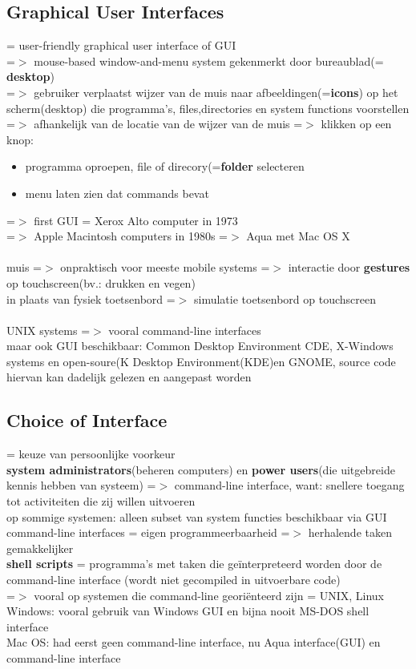 \documentclass{report}
\begin{document}
\subsection{Graphical User Interfaces}
= user-friendly graphical user interface of GUI
\\=$>$ mouse-based window-and-menu system gekenmerkt door bureaublad(= \textbf{desktop})
\\=$>$ gebruiker verplaatst wijzer van de muis naar afbeeldingen(=\textbf{icons}) op het scherm(desktop) die programma's, files,directories en system functions voorstellen
\\=$>$ afhankelijk van de locatie van de wijzer van de muis =$>$ klikken op een knop:
\begin{itemize}
\item programma oproepen, file of direcory(=\textbf{folder} selecteren
\item menu laten zien dat commands bevat
\end{itemize}
=$>$ first GUI = Xerox Alto computer in 1973
\\=$>$ Apple Macintosh computers in 1980s =$>$ Aqua met Mac OS X
\\
\\ muis =$>$ onpraktisch voor meeste mobile systems =$>$ interactie door \textbf{gestures} op touchscreen(bv.: drukken en vegen)
\\ in plaats van fysiek toetsenbord =$>$ simulatie toetsenbord op touchscreen
\\
\\UNIX systems =$>$ vooral command-line interfaces
\\maar ook GUI beschikbaar: Common Desktop Environment CDE, X-Windows systems en open-soure(K Desktop Environment(KDE)en GNOME, source code hiervan kan dadelijk gelezen en aangepast worden 

\subsection{Choice of Interface}
= keuze van persoonlijke voorkeur 
\\ \textbf{system administrators}(beheren computers) en \textbf{power users}(die uitgebreide kennis hebben van systeem) =$>$ command-line interface, want: snellere toegang tot activiteiten die zij willen uitvoeren
\\op sommige systemen: alleen subset van system functies beschikbaar via GUI
\\command-line interfaces = eigen programmeerbaarheid =$>$ herhalende taken gemakkelijker
\\ \textbf{shell scripts} = programma's met taken die ge\"interpreteerd worden door de command-line interface (wordt niet gecompiled in uitvoerbare code)
\\ =$>$ vooral op systemen die command-line georiënteerd zijn = UNIX, Linux 
\\ Windows: vooral gebruik van Windows GUI en bijna nooit MS-DOS shell interface
\\ Mac OS: had eerst geen command-line interface, nu Aqua interface(GUI) en command-line interface
\end{document}
